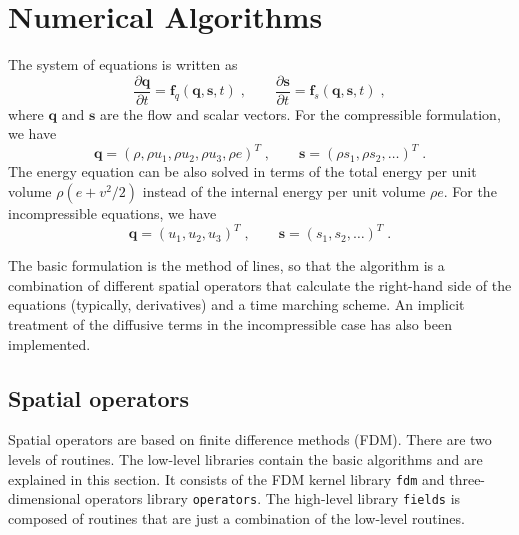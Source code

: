 \chapter{Numerical Algorithms}\label{sec:numerics}

The system of equations is written as
\begin{equation}
  \frac{\partial \mathbf{q}}{\partial t} = \mathbf{f}_q(\mathbf{q},
  \boldsymbol{s},t) \;,\qquad
  \frac{\partial \mathbf{s}}{\partial t} = \mathbf{f}_s(\mathbf{q},
  \boldsymbol{s},t) \;,
\label{equ:problem}
\end{equation}
where $\boldsymbol{q}$ and $\boldsymbol{s}$ are the flow and scalar vectors. For the compressible formulation, we have
\begin{equation}
  \mathbf{q} = (\rho, \rho u_1, \rho u_2, \rho u_3, \rho e)^T \;,\qquad
  \mathbf{s} = (\rho s_1, \rho s_2, \ldots)^T \;.
\end{equation}
The energy equation can be also solved in terms of the total energy per unit volume $\rho(e+v^2/2)$ instead of the internal energy per unit volume $\rho e$. For the incompressible equations, we have
\begin{equation}
  \mathbf{q} = (u_1, u_2, u_3)^T \;,\qquad
  \mathbf{s} = ( s_1, s_2, \ldots)^T \;.
\end{equation}

The basic formulation is the method of lines, so that the algorithm is a combination of different spatial operators that calculate the right-hand side of the equations (typically, derivatives) and a time marching scheme. An implicit treatment of the diffusive terms in the incompressible case has also been implemented.

\section{Spatial operators}

Spatial operators are based on finite difference methods (FDM). There are two levels of routines. The low-level libraries contain the basic algorithms and are explained in this section. It consists of the FDM kernel library {\tt fdm} and three-dimensional operators library {\tt operators}. The high-level library {\tt fields} is composed of routines that are just a combination of the low-level routines.

